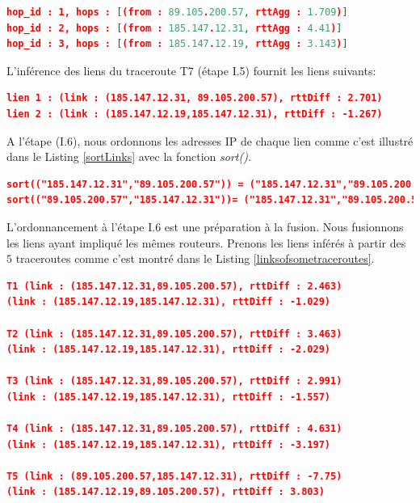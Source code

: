 \begin{lstlisting}[language=json,firstnumber=1, caption={Les sauts du traceroute T7 (après l'agrégation)}, basicstyle=\footnotesize, label=aftermedianagg]
hop_id : 1, hops : [(from : 89.105.200.57, rttAgg : 1.709)]
hop_id : 2, hops : [(from : 185.147.12.31, rttAgg : 4.41)] 
hop_id : 3, hops : [(from : 185.147.12.19, rttAgg : 3.143)]
\end{lstlisting}

L'inférence  des liens du traceroute T7 (étape I.5) fournit les liens suivants: 

\begin{lstlisting}[language=json,firstnumber=1, caption={Exemple des liens inférés du traceroute T7}, basicstyle = \footnotesize]
lien 1 : (link : (185.147.12.31, 89.105.200.57), rttDiff : 2.701)
lien 2 : (link : (185.147.12.19,185.147.12.31), rttDiff : -1.267)
\end{lstlisting}


A l'étape (I.6), nous ordonnons les adresses IP de chaque lien  comme c'est illustré dans le Listing \ref{sortLinks} avec la fonction \textit{sort()}. 

\begin{lstlisting}[language=json,firstnumber=1, caption={Illustration de l'ordre des liens}, basicstyle = \footnotesize, label=sortLinks]
sort(("185.147.12.31","89.105.200.57")) = ("185.147.12.31","89.105.200.57")
sort(("89.105.200.57","185.147.12.31"))= ("185.147.12.31","89.105.200.57")   
\end{lstlisting}

L'ordonnancement à l'étape  I.6 est une préparation à la fusion. Nous fusionnons les liens ayant impliqué les mêmes routeurs. Prenons les liens inférés à partir des $5$ traceroutes  comme c'est montré dans le Listing \ref{linksofsometraceroutes}.

\begin{lstlisting}[language=json,firstnumber=1, caption={Liste des liens possibles inférés via  les traceroutes T1, T2, T3, T4 et T5}, basicstyle = \footnotesize, label=linksofsometraceroutes]
T1 (link : (185.147.12.31,89.105.200.57), rttDiff : 2.463)
(link : (185.147.12.19,185.147.12.31), rttDiff : -1.029)

T2 (link : (185.147.12.31,89.105.200.57), rttDiff : 3.463) 
(link : (185.147.12.19,185.147.12.31), rttDiff : -2.029)

T3 (link : (185.147.12.31,89.105.200.57), rttDiff : 2.991) 
(link : (185.147.12.19,185.147.12.31), rttDiff : -1.557)

T4 (link : (185.147.12.31,89.105.200.57), rttDiff : 4.631) 
(link : (185.147.12.19,185.147.12.31), rttDiff : -3.197)

T5 (link : (89.105.200.57,185.147.12.31), rttDiff : -7.75) 
(link : (185.147.12.19,89.105.200.57), rttDiff : 3.803)
\end{lstlisting}

